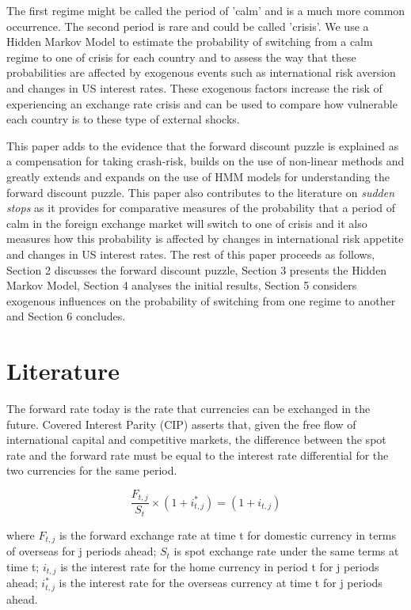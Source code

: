 \documentclass[12pt, a4paper, oneside]{article}\usepackage[]{graphicx}\usepackage[]{color}
\begin{document}
The first regime might be called the period of 'calm' and is a much more common occurrence. The second period is rare and could be called 'crisis'.  We use a Hidden Markov Model to estimate the probability of switching from a calm regime to one of crisis for each country and to assess the way that these probabilities are affected by exogenous events such as international risk aversion and changes in US interest rates.  These exogenous factors increase the risk of experiencing an exchange rate crisis and can be used to compare how vulnerable each country is to these type of external shocks. 



This paper adds to the evidence that the forward discount puzzle is explained as a compensation for taking crash-risk, builds on the use of non-linear methods  and greatly extends and expands on the use of HMM models for understanding the forward discount puzzle.  This paper also contributes to the literature on \emph{sudden stops} as it provides for comparative measures of the probability that a period of calm in the foreign exchange market will switch to one of crisis and it also measures how this probability is affected by changes in international risk appetite and changes in US interest rates.  The rest of this paper proceeds as follows, Section 2 discusses the forward discount puzzle, Section 3 presents the Hidden Markov Model, Section 4 analyses the initial results, Section 5 considers exogenous influences on the probability of switching from one regime to another and Section 6 concludes. 

\section{Literature}
 \label{secref:UIP}
The forward rate today is the rate that currencies can be exchanged in the future.  Covered Interest Parity (CIP) asserts that, given the free flow of international capital and competitive markets,  the difference between the spot rate and the forward rate must be equal to the interest rate differential for the two currencies for the same period.    

\begin{equation}
\frac{F_{t, j}}{S_t} \times (1 + i_{t,j}^*) = (1 + i_{t,j})  
\end{equation}

where $F_{t, j}$ is the forward exchange rate at time t for domestic currency in terms of overseas for j periods ahead;  $S_t$ is spot exchange rate under the same terms at time t; $i_{t,j}$ is the interest rate for the home currency in period t for j periods ahead; $i_{t, j}^*$ is the interest rate for the overseas currency at time t for j periods ahead.
\end{document}
